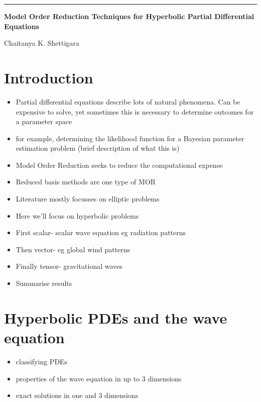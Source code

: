 


\begin{titlepage}
\begin{flushleft}
\hrule
\vspace{1 cm}
{\huge{\bf{Model Order Reduction Techniques for Hyperbolic Partial Differential Equations}}}


\vspace*{2cm}\vspace{3 cm}
{\large Chaitanya K. Shettigara}

\vspace{0.5 cm}{\today}
\end{flushleft}
\end{titlepage}

\newpage {}
\tableofcontents

\newpage {}

\chapter{Introduction}
\begin{itemize}
\item Partial differential equations describe lots of natural phenomena. Can be expensive to solve, yet sometimes this is necessary to determine outcomes for a parameter space
\item for example, determining the likelihood function for a Bayesian parameter estimation problem (brief description of what this is)
\item Model Order Reduction seeks to reduce the computational expense
\item Reduced basis methods are one type of MOR
\item Literature mostly focusses on elliptic problems
\item Here we'll focus on hyperbolic problems
\item First scalar- scalar wave equation eg radiation patterns
\item Then vector- eg global wind patterns
\item Finally tensor- gravitational waves
\item Summarise results
\end{itemize}

\chapter{Hyperbolic PDEs and the wave equation}
\begin{itemize}
\item classifying PDEs
\item properties of the wave equation in up to 3 dimensions
\item exact solutions in one and 3 dimensions
\end{itemize}

